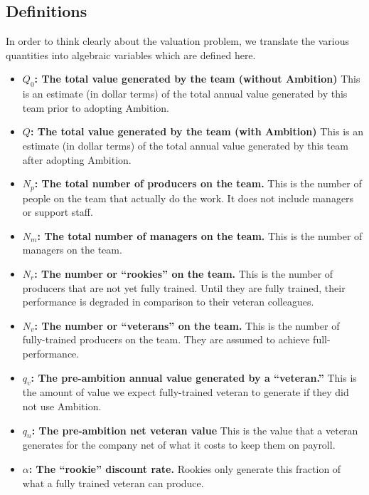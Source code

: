 \documentclass[paper=a4, fontsize=11pt abstract]{scrartcl}
\numberwithin{equation}{section}		%
\numberwithin{figure}{section}			%
\numberwithin{table}{section}				%
\begin{document}
\subsection{Definitions}
In order to think clearly about the valuation problem, we translate the various quantities into algebraic variables which are defined here.
\begin{itemize}
    \item $Q_0$\textbf{: The total value generated by the team (without Ambition)}
    This is an estimate (in dollar terms) of the total annual value generated by this team prior to adopting Ambition.
    
    \item $Q$\textbf{: The total value generated by the team (with Ambition)}
    This is an estimate (in dollar terms) of the total annual value generated by this team after adopting Ambition.
    
    \item $N_p$\textbf{: The total number of producers on the team.}
    This is the number of people on the team that actually do the work.  It does not include managers or support staff.
    
    \item $N_m$\textbf{: The total number of managers on the team.}  This is the number of managers on the team.
    
    \item $N_r$\textbf{: The number or ``rookies'' on the team.}  This is the number of producers that are not yet fully trained.  Until they are fully trained, their performance is degraded in comparison to their veteran colleagues.
    
    \item $N_v$\textbf{: The number or ``veterans'' on the team.}  This is the number of fully-trained producers on the team. They are assumed to achieve full-performance.
    
    \item $q_{v}$\textbf{: The pre-ambition annual value generated by a ``veteran.''}  This is the amount of value we expect fully-trained veteran to generate if they did not use Ambition.
    
    \item $q_{n}$\textbf{: The pre-ambition net veteran value}  This is the value that a veteran generates for the company net of what it costs to keep them on payroll.
    
    \item $\alpha$\textbf{: The ``rookie'' discount rate.}  Rookies only generate this fraction of what a fully trained veteran can produce.
    

\end{itemize}
\end{document}
